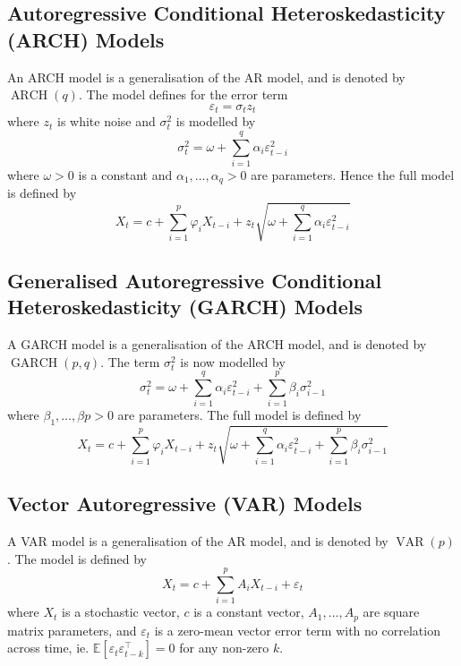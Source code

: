 \documentclass[11pt]{report} %
\begin{document}
\subsection{Autoregressive Conditional Heteroskedasticity (ARCH) Models}
An ARCH model is a generalisation of the AR model, and is denoted by $\operatorname{ARCH}\left(q\right)$. The model defines for the error term
\begin{equation}
\varepsilon_{t} = \sigma_{t}z_{t}
\end{equation}
where $z_{t}$ is white noise and $\sigma^{2}_{t}$ is modelled by
\begin{equation}
\sigma^{2}_{t} = \omega + \sum_{i = 1}^{q}\alpha_{i}\varepsilon^{2}_{t - i}
\end{equation}
where $\omega > 0$ is a constant and $\alpha_{1}, \dots, \alpha_{q} > 0$ are parameters. Hence the full model is defined by
\begin{equation}
X_{t} = c + \sum_{i = 1}^{p}\varphi_{i}X_{t - i} + z_{t}\sqrt{\omega + \sum_{i = 1}^{q}\alpha_{i}\varepsilon^{2}_{t - i}}
\end{equation}

\subsection{Generalised Autoregressive Conditional Heteroskedasticity (GARCH) Models}
A GARCH model is a generalisation of the ARCH model, and is denoted by $\operatorname{GARCH}\left(p, q\right)$. The term $\sigma^{2}_{t}$ is now modelled by
\begin{equation}
\sigma^{2}_{t} = \omega + \sum_{i = 1}^{q}\alpha_{i}\varepsilon^{2}_{t - i} + \sum_{i = 1}^{p}\beta_{i}\sigma^{2}_{i - 1}
\end{equation}
where $\beta_{1}, \dots, \beta{p} > 0$ are parameters. The full model is defined by
\begin{equation}
X_{t} = c + \sum_{i = 1}^{p}\varphi_{i}X_{t - i} + z_{t}\sqrt{\omega + \sum_{i = 1}^{q}\alpha_{i}\varepsilon^{2}_{t - i} + \sum_{i = 1}^{p}\beta_{i}\sigma^{2}_{i - 1}}
\end{equation}

\subsection{Vector Autoregressive (VAR) Models}
A VAR model is a generalisation of the AR model, and is denoted by  $\operatorname{VAR}\left(p\right)$. The model is defined by
\begin{equation}
X_{t} = c + \sum_{i = 1}^{p}A_{i}X_{t - i} + \varepsilon_{t}
\end{equation}
where $X_{t}$ is a stochastic vector, $c$ is a constant vector, $A_{1}, \dots, A_{p}$ are square matrix parameters, and $\varepsilon_{t}$ is a zero-mean vector error term with no correlation across time, ie. $\mathbb{E}\left[\varepsilon_{t}\varepsilon_{t - k}^{\top}\right] = 0$ for any non-zero $k$.
\end{document}
